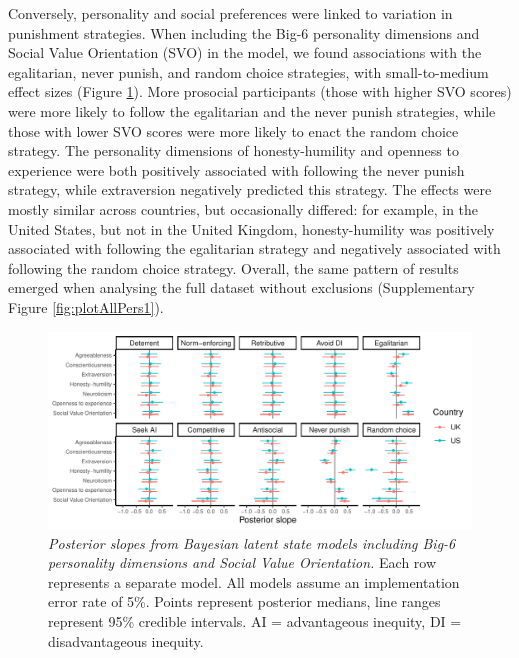 \documentclass[
  english,
  man, donotrepeattitle,floatsintext]{apa6}
\begin{document}
Conversely, personality and social preferences were linked to variation in
punishment strategies. When including the Big-6 personality dimensions and
Social Value Orientation (SVO) in the model, we found associations with the
egalitarian, never punish, and random choice strategies, with small-to-medium
effect sizes (Figure \ref{fig:plotAllPers2}). More prosocial participants
(those with higher SVO scores) were more likely to follow the egalitarian and
the never punish strategies, while those with lower SVO scores were more likely
to enact the random choice strategy. The personality dimensions of
honesty-humility and openness to experience were both positively associated with
following the never punish strategy, while extraversion negatively predicted
this strategy. The effects were mostly similar across countries, but
occasionally differed: for example, in the United States, but not in the United
Kingdom, honesty-humility was positively associated with following the
egalitarian strategy and negatively associated with following the random
choice strategy. Overall, the same pattern of results emerged when analysing the
full dataset without exclusions (Supplementary Figure \ref{fig:plotAllPers1}).







\begin{figure}
\centering
\includegraphics{manuscript_files/figure-latex/plotAllPers2-1.pdf}
\caption{\label{fig:plotAllPers2}\emph{Posterior slopes from Bayesian latent state models
including Big-6 personality dimensions and Social Value Orientation.} Each row
represents a separate model. All models assume an implementation error rate of
5\%. Points represent posterior medians, line ranges represent 95\% credible
intervals. AI = advantageous inequity, DI = disadvantageous inequity.}
\end{figure}
\end{document}
